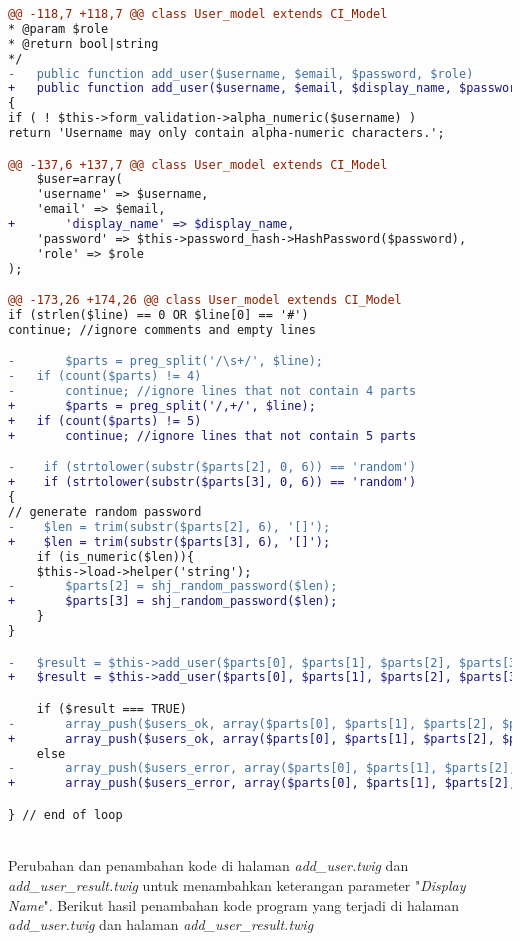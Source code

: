 \begin{lstlisting}[language=diff, basicstyle=\ttfamily, frame=single,
columns=fullflexible, keepspaces=true, breaklines=true]
@@ -118,7 +118,7 @@ class User_model extends CI_Model
* @param $role
* @return bool|string
*/
-   public function add_user($username, $email, $password, $role)
+   public function add_user($username, $email, $display_name, $password, $role)
{
if ( ! $this->form_validation->alpha_numeric($username) )
return 'Username may only contain alpha-numeric characters.';

@@ -137,6 +137,7 @@ class User_model extends CI_Model
	$user=array(
	'username' => $username,
	'email' => $email,
+   	'display_name' => $display_name,
	'password' => $this->password_hash->HashPassword($password),
	'role' => $role
);

@@ -173,26 +174,26 @@ class User_model extends CI_Model
if (strlen($line) == 0 OR $line[0] == '#')
continue; //ignore comments and empty lines

-       $parts = preg_split('/\s+/', $line);
-   if (count($parts) != 4)
-   	continue; //ignore lines that not contain 4 parts
+       $parts = preg_split('/,+/', $line);
+   if (count($parts) != 5)
+       continue; //ignore lines that not contain 5 parts

-    if (strtolower(substr($parts[2], 0, 6)) == 'random')
+    if (strtolower(substr($parts[3], 0, 6)) == 'random')
{
// generate random password
-    $len = trim(substr($parts[2], 6), '[]');
+    $len = trim(substr($parts[3], 6), '[]');
	if (is_numeric($len)){
	$this->load->helper('string');
-   	$parts[2] = shj_random_password($len);
+       $parts[3] = shj_random_password($len);
	}
}

-   $result = $this->add_user($parts[0], $parts[1], $parts[2], $parts[3]);
+   $result = $this->add_user($parts[0], $parts[1], $parts[2], $parts[3], $parts[4]);

	if ($result === TRUE)
-   	array_push($users_ok, array($parts[0], $parts[1], $parts[2], $parts[3]));
+       array_push($users_ok, array($parts[0], $parts[1], $parts[2], $parts[3], $parts[4]));
	else
-       array_push($users_error, array($parts[0], $parts[1], $parts[2], $parts[3], $result));
+       array_push($users_error, array($parts[0], $parts[1], $parts[2], $parts[3], $parts[4], $result));

} // end of loop
\end{lstlisting}
~\\
Perubahan dan penambahan kode di halaman \textit{add\_user.twig} dan \textit{add\_user\_result.twig} untuk menambahkan keterangan parameter "\textit{Display Name}". Berikut hasil penambahan kode program yang terjadi di halaman \textit{add\_user.twig} dan halaman \textit{add\_user\_result.twig}\\

